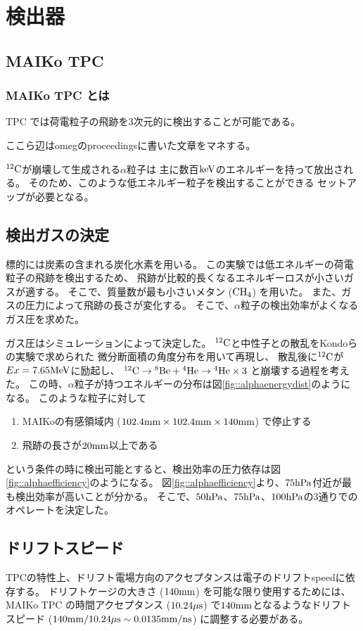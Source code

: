 \chapter{検出器}
\section{MAIKo TPC}
\subsection{MAIKo TPC とは}
TPC では荷電粒子の飛跡を3次元的に検出することが可能である。

ここら辺はomegのproceedingsに書いた文章をマネする。

${}^{12}\rm{C}$が崩壊して生成される$\alpha$粒子は
主に数百$\rm{keV}$のエネルギーを持って放出される。
そのため、このような低エネルギー粒子を検出することができる
セットアップが必要となる。

\section{検出ガスの決定}
標的には炭素の含まれる炭化水素を用いる。
この実験では低エネルギーの荷電粒子の飛跡を検出するため、
飛跡が比較的長くなるエネルギーロスが小さいガスが適する。
そこで、質量数が最も小さいメタン ($\rm{CH}_{4}$) を用いた。
また、ガスの圧力によって飛跡の長さが変化する。
そこで、$\alpha$粒子の検出効率がよくなるガス圧を求めた。

ガス圧はシミュレーションによって決定した。
${}^{12}\rm{C}$と中性子との散乱をKondoらの実験で求められた
微分断面積の角度分布を用いて再現し、
散乱後に${}^{12}\rm{C}$が$Ex = 7.65\rm{MeV}$に励起し、
${}^{12}\rm{C}\rightarrow{}^{8}\rm{Be}+{}^{4}\rm{He}\rightarrow{}^{4}\rm{He}\times 3$
と崩壊する過程を考えた。
この時、$\alpha$粒子が持つエネルギーの分布は図\ref{fig::alphaenergydist}のようになる。
このような粒子に対して
\begin{enumerate}
\item
  MAIKoの有感領域内 ($102.4\rm{mm}\times 102.4\rm{mm}\times 140\rm{mm}$) で停止する
\item
  飛跡の長さが$20\rm{mm}$以上である
\end{enumerate}
という条件の時に検出可能とすると、検出効率の圧力依存は図\ref{fig::alphaefficiency}のようになる。
図\ref{fig::alphaefficiency}より、$75\rm{hPa}$付近が最も検出効率が高いことが分かる。
そこで、$50\rm{hPa}$、$75\rm{hPa}$、$100\rm{hPa}$の3通りでのオペレートを決定した。

\section{ドリフトスピード}
TPCの特性上、ドリフト電場方向のアクセプタンスは電子のドリフトspeedに依存する。
ドリフトケージの大きさ ($140\rm{mm}$) を可能な限り使用するためには、
MAIKo TPC の時間アクセプタンス ($10.24\rm{\mu s}$) で$140\rm{mm}$となるようなドリフトスピード
($140\rm{mm}/10.24\rm{\mu s} \sim 0.0135\rm{mm/ns}$) に調整する必要がある。

